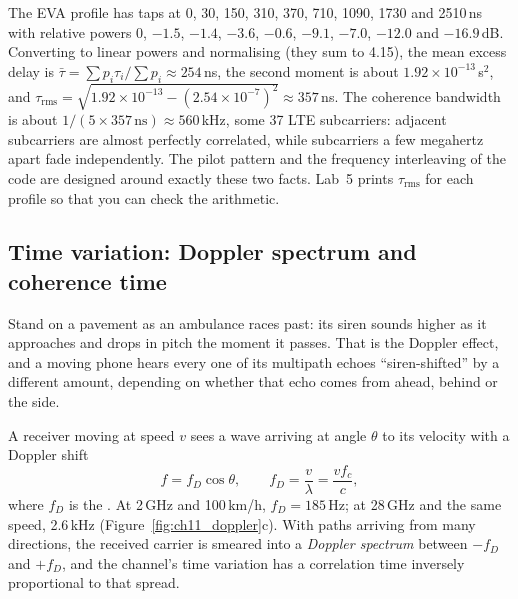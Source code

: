 
\begin{worked}
The EVA profile has taps at 0, 30, 150, 310, 370, 710, 1090, 1730 and 2510\,ns with relative
powers 0, $-1.5$, $-1.4$, $-3.6$, $-0.6$, $-9.1$, $-7.0$, $-12.0$ and $-16.9$\,dB. Converting to linear
powers and normalising (they sum to 4.15), the mean excess delay is
$\bar\tau=\sum p_i\tau_i/\sum p_i\approx254$\,ns, the second moment is about
$1.92\times10^{-13}$\,s$^2$, and $\tau_{\text{rms}}=\sqrt{1.92\times10^{-13}-(2.54\times10^{-7})^2}
\approx357$\,ns. The coherence bandwidth is about $1/(5\times357\,\text{ns})\approx560$\,kHz, some 37
LTE subcarriers: adjacent subcarriers are almost perfectly correlated, while subcarriers a few
megahertz apart fade independently. The pilot pattern and the frequency interleaving of the code
are designed around exactly these two facts. Lab~5 prints $\tau_{\text{rms}}$ for each profile so
that you can check the arithmetic.
\end{worked}

\subsection{Time variation: Doppler spectrum and coherence time}

Stand on a pavement as an ambulance races past: its siren sounds higher as it approaches and
drops in pitch the moment it passes. That is the Doppler effect, and a moving phone hears every
one of its multipath echoes ``siren-shifted'' by a different amount, depending on whether that
echo comes from ahead, behind or the side.

A receiver moving at speed $v$ sees a wave arriving at angle $\theta$ to its velocity with a Doppler
shift
\begin{equation}
f=f_D\cos\theta,\qquad f_D=\frac{v}{\lambda}=\frac{vf_c}{c},
\end{equation}
where $f_D$ is the . At 2\,GHz and 100\,km/h, $f_D=185$\,Hz; at
28\,GHz and the same speed, 2.6\,kHz (Figure~\ref{fig:ch11_doppler}c). With paths arriving from
many directions, the received carrier is smeared into a \emph{Doppler spectrum} between $-f_D$
and $+f_D$, and the channel's time variation has a correlation time inversely proportional to
that spread.

